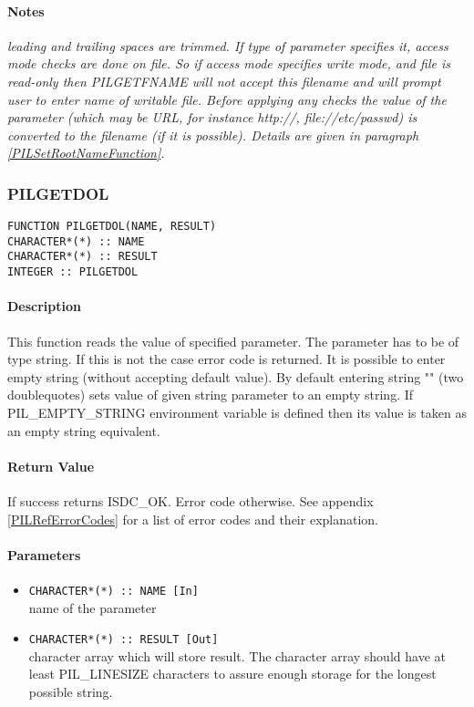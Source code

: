\paragraph{Notes\\}
{\it
leading and trailing spaces are trimmed.
If type of parameter specifies it, access mode checks are done on file. So
if access mode specifies write
mode, and file is read-only then PILGETFNAME will not accept this filename
and will prompt user to enter name of writable file. 
Before applying any checks the value of the parameter (which may be URL, 
for instance http://, file://etc/passwd) is converted to the filename
(if it is possible). Details are given in paragraph \ref{PILSetRootNameFunction}.
}



\subsubsection{PILGETDOL}

\begin{verbatim}
FUNCTION PILGETDOL(NAME, RESULT) 
CHARACTER*(*) :: NAME 
CHARACTER*(*) :: RESULT 
INTEGER :: PILGETDOL
\end{verbatim}

\paragraph{Description\\}
This function reads the value of specified parameter. The parameter has to
be of type string. If this is not the case error code is returned. 
It is possible to enter empty string (without accepting default value).
By default entering string "" (two doublequotes) sets value of given string
parameter to an empty string. If PIL\_EMPTY\_STRING environment variable
is defined then its value is taken as an empty string equivalent.

\paragraph{Return Value\\}
If success returns ISDC\_OK. Error code otherwise. See appendix \ref{PILRefErrorCodes}
for a list of error codes and their explanation.

\paragraph{Parameters}
\begin{itemize}
\item
{\tt CHARACTER*(*) :: NAME [In] } \\
name of the parameter 
\item
{\tt CHARACTER*(*) :: RESULT [Out] } \\
character array which will store result. The character array should have at
least PIL\_LINESIZE characters to assure enough storage for the longest possible string. 
\end{itemize}

